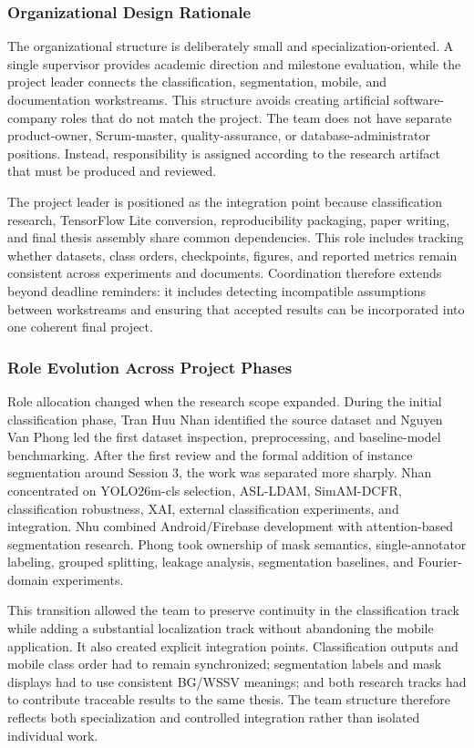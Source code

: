 \subsubsection{Organizational Design Rationale}
The organizational structure is deliberately small and specialization-oriented. A single supervisor provides academic direction and milestone evaluation, while the project leader connects the classification, segmentation, mobile, and documentation workstreams. This structure avoids creating artificial software-company roles that do not match the project. The team does not have separate product-owner, Scrum-master, quality-assurance, or database-administrator positions. Instead, responsibility is assigned according to the research artifact that must be produced and reviewed.\par
The project leader is positioned as the integration point because classification research, TensorFlow Lite conversion, reproducibility packaging, paper writing, and final thesis assembly share common dependencies. This role includes tracking whether datasets, class orders, checkpoints, figures, and reported metrics remain consistent across experiments and documents. Coordination therefore extends beyond deadline reminders: it includes detecting incompatible assumptions between workstreams and ensuring that accepted results can be incorporated into one coherent final project.\par
\subsubsection{Role Evolution Across Project Phases}
Role allocation changed when the research scope expanded. During the initial classification phase, Tran Huu Nhan identified the source dataset and Nguyen Van Phong led the first dataset inspection, preprocessing, and baseline-model benchmarking. After the first review and the formal addition of instance segmentation around Session 3, the work was separated more sharply. Nhan concentrated on YOLO26m-cls selection, ASL-LDAM, SimAM-DCFR, classification robustness, XAI, external classification experiments, and integration. Nhu combined Android/Firebase development with attention-based segmentation research. Phong took ownership of mask semantics, single-annotator labeling, grouped splitting, leakage analysis, segmentation baselines, and Fourier-domain experiments.\par
This transition allowed the team to preserve continuity in the classification track while adding a substantial localization track without abandoning the mobile application. It also created explicit integration points. Classification outputs and mobile class order had to remain synchronized; segmentation labels and mask displays had to use consistent BG/WSSV meanings; and both research tracks had to contribute traceable results to the same thesis. The team structure therefore reflects both specialization and controlled integration rather than isolated individual work.\par
